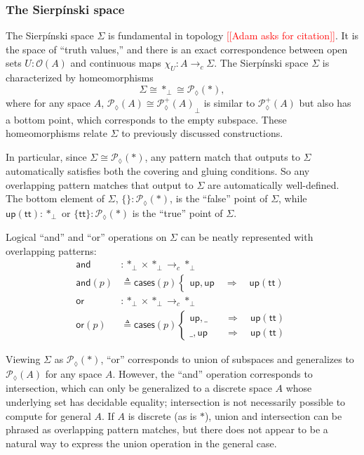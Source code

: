 \documentclass[conference]{IEEEtran}
\newcommand{\PLower}{\mathcal{P}_\lozenge}
\newcommand{\cto}{\to_c}
\newcommand{\One}{\ast}
\newcommand{\Open}[1]{\mathcal{O}({#1})}
\newcommand{\wildcard}{\_}
\newcommand{\Branch}{\Rightarrow}
\newcommand{\up}{\mathsf{up}}
\newcommand{\note}[1]{\textcolor{red}{[[{#1}]]}}
\begin{document}
\subsubsection{The Sierp\'inski space}

The Sierp\'inski space $\Sigma$ is fundamental in topology \note{Adam asks for citation}. It is the space of ``truth values,'' and there is an exact correspondence between open sets $U : \Open{A}$ and continuous maps $\chi_U : A \cto \Sigma$. The Sierp\'inski space $\Sigma$ is characterized by homeomorphisms
\[
\Sigma \cong \One_\bot \cong \PLower(\One) ,
\]
where for any space $A$, $\PLower(A) \cong {\PLower^+(A)}_\bot$ is similar to $\PLower^+(A)$ but also has a bottom point, which corresponds to the empty subspace. These homeomorphisms relate $\Sigma$ to previously discussed constructions.

In particular, since $\Sigma \cong \PLower(\One)$, any pattern match that outputs to $\Sigma$ automatically satisfies both the covering and gluing conditions. So any overlapping pattern matches that output to $\Sigma$ are automatically well-defined. The bottom element of $\Sigma$, $\{ \} : \PLower(\One)$, is the ``false'' point of $\Sigma$, while $\up(\mathsf{tt}) : \One_\bot$ or $\{ \mathsf{tt} \} : \PLower(\One)$ is the ``true'' point of $\Sigma$.

Logical ``and'' and ``or'' operations on $\Sigma$ can be neatly represented with overlapping patterns:
\begin{align*}
\mathsf{and} &: \One_\bot \times \One_\bot \cto \One_\bot
\\ \mathsf{and}(p) &\triangleq \mathsf{cases}(p)
\begin{cases}
\up , \up
  \quad \Branch \quad \up(\mathsf{tt})
\end{cases}
\\
\mathsf{or} &: \One_\bot \times \One_\bot \cto \One_\bot
\\ \mathsf{or}(p) &\triangleq \mathsf{cases}(p)
\begin{cases}
\up , \wildcard
  \quad &\Branch \quad \up(\mathsf{tt})
\\  \wildcard , \up
  \quad &\Branch \quad \up(\mathsf{tt})
\end{cases}
\end{align*}

Viewing $\Sigma$ as $\PLower(\One)$, ``or'' corresponds to union of subspaces and generalizes to $\PLower(A)$ for any space $A$. However, the ``and'' operation corresponds to intersection, which can only be generalized to a discrete space $A$ whose underlying set has decidable equality; intersection is not necessarily possible to compute for general $A$. If $A$ is discrete (as is $\One$), union and intersection can be phrased as overlapping pattern matches, but there does not appear to be a natural way to express the union operation in the general case.
\end{document}
